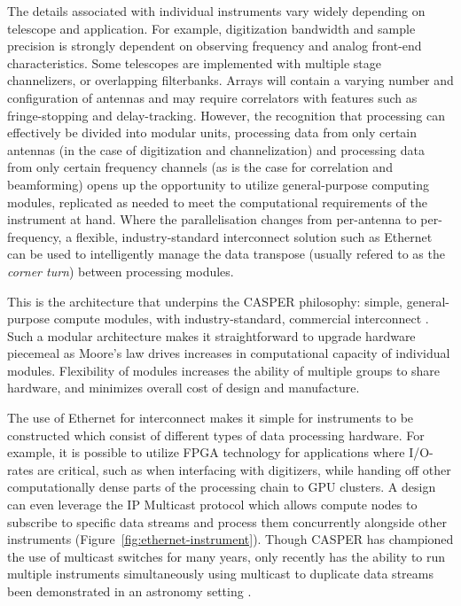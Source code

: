 \documentclass{ws-jai}
\begin{document}
The details associated with individual instruments vary widely depending
on telescope and application. For example, digitization bandwidth and sample precision
is strongly dependent on observing frequency and analog front-end
characteristics. Some telescopes are implemented with
multiple stage channelizers, or overlapping filterbanks. Arrays will contain a varying number and configuration of antennas and may require correlators with features such as fringe-stopping and delay-tracking.
However, the recognition that
processing can effectively be divided into modular units, processing data
from only certain antennas (in the case of digitization and channelization) and
 processing data from only certain frequency channels (as is the case for
correlation and beamforming) opens up the opportunity to utilize
general-purpose computing modules, replicated as needed to meet the computational
requirements of the instrument at hand. Where the parallelisation changes from
per-antenna to per-frequency, a flexible, industry-standard interconnect
solution such as Ethernet can be used to intelligently manage the
data transpose (usually refered to as the \emph{corner turn}) between
processing modules.

This is the architecture that underpins the CASPER philosophy: simple,
general-purpose compute modules, with industry-standard, commercial
interconnect \citep{parsons-petaop, parsons2008scalable, pars05}. Such a modular architecture makes it straightforward to upgrade hardware
piecemeal as Moore's law drives increases in computational capacity of
individual modules. Flexibility of modules increases the ability of multiple
groups to share hardware, and minimizes overall cost of design and manufacture.

The use of Ethernet for interconnect makes it simple for instruments to be
constructed which consist of different types of data processing hardware. For example, it is possible
to utilize FPGA technology for applications where I/O-rates are critical, such
as when interfacing with digitizers, while handing off other computationally
dense parts of the processing chain to GPU clusters. A
design can even leverage the IP Multicast protocol
which allows compute nodes to subscribe to
specific data streams and process them concurrently alongside other instruments (Figure~\ref{fig:ethernet-instrument}).
Though CASPER has championed the use of multicast switches for many years, only recently has the ability to run multiple instruments simultaneously using multicast to duplicate data streams been demonstrated in an astronomy setting \citep{man14}. 
\end{document}
